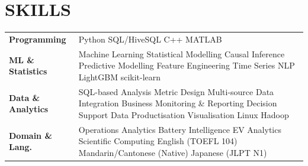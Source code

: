 \documentclass[a4paper,10pt]{article}
\begin{document}
\section{SKILLS}
\begin{tabular}{@{}p{3.0cm}p{12.5cm}@{}}
\textbf{Programming} & Python \textperiodcentered{} SQL/HiveSQL \textperiodcentered{} C++ \textperiodcentered{} MATLAB \\[1pt]
\textbf{ML \& Statistics} & Machine Learning \textperiodcentered{} Statistical Modelling \textperiodcentered{} Causal Inference \textperiodcentered{} Predictive Modelling \textperiodcentered{} Feature Engineering \textperiodcentered{} Time Series \textperiodcentered{} NLP \textperiodcentered{} LightGBM \textperiodcentered{} scikit-learn \\[1pt]
\textbf{Data \& Analytics} & SQL-based Analysis \textperiodcentered{} Metric Design \textperiodcentered{} Multi-source Data Integration \textperiodcentered{} Business Monitoring \& Reporting \textperiodcentered{} Decision Support \textperiodcentered{} Data Productisation \textperiodcentered{} Visualisation \textperiodcentered{} Linux \textperiodcentered{} Hadoop \\[1pt]
\textbf{Domain \& Lang.} & Operations Analytics \textperiodcentered{} Battery Intelligence \textperiodcentered{} EV Analytics \textperiodcentered{} Scientific Computing \textperiodcentered{} English (TOEFL 104) \textperiodcentered{} Mandarin/Cantonese (Native) \textperiodcentered{} Japanese (JLPT N1) \\
\end{tabular}
\end{document}
